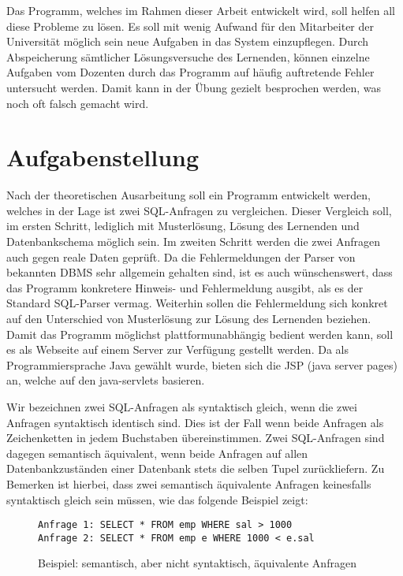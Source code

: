 Das Programm, welches im Rahmen dieser Arbeit entwickelt wird, soll helfen all diese Probleme zu lösen. Es soll mit wenig Aufwand für den Mitarbeiter der Universität möglich sein neue Aufgaben in das System einzupflegen. Durch Abspeicherung sämtlicher Lösungsversuche des Lernenden, können einzelne Aufgaben vom Dozenten durch das Programm auf häufig auftretende Fehler untersucht werden. Damit kann in der Übung gezielt besprochen werden, was noch oft falsch gemacht wird.

\section{Aufgabenstellung}

Nach der theoretischen Ausarbeitung soll ein Programm entwickelt werden, welches in der Lage ist zwei SQL-Anfragen zu vergleichen. Dieser Vergleich soll, im ersten Schritt, lediglich mit Musterlösung, Lösung des Lernenden und Datenbankschema möglich sein. Im zweiten Schritt werden die zwei Anfragen auch gegen reale Daten geprüft. Da die Fehlermeldungen der Parser von bekannten DBMS sehr allgemein gehalten sind, ist es auch wünschenswert, dass das Programm konkretere Hinweis- und Fehlermeldung ausgibt, als es der Standard SQL-Parser vermag. Weiterhin sollen die Fehlermeldung sich konkret auf den Unterschied von Musterlösung zur Lösung des Lernenden beziehen. Damit das Programm möglichst plattformunabhängig bedient werden kann, soll es als Webseite auf einem Server zur Verfügung gestellt werden. Da als Programmiersprache Java gewählt wurde, bieten sich die JSP (java server pages) an, welche auf den java-servlets basieren.

Wir bezeichnen zwei SQL-Anfragen als syntaktisch gleich, wenn die zwei Anfragen syntaktisch identisch sind. Dies ist der Fall wenn beide Anfragen als Zeichenketten in jedem Buchstaben übereinstimmen. Zwei SQL-Anfragen sind dagegen semantisch äquivalent, wenn beide Anfragen auf allen Datenbankzuständen einer Datenbank stets die selben Tupel zurückliefern. Zu Bemerken ist hierbei, dass zwei semantisch äquivalente Anfragen keinesfalls syntaktisch gleich sein müssen, wie das folgende Beispiel zeigt:

\begin{figure}[h]
\begin{verbatim}
Anfrage 1: SELECT * FROM emp WHERE sal > 1000
Anfrage 2: SELECT * FROM emp e WHERE 1000 < e.sal
\end{verbatim}
\caption{Beispiel: semantisch, aber nicht syntaktisch, äquivalente Anfragen}
\end{figure}

